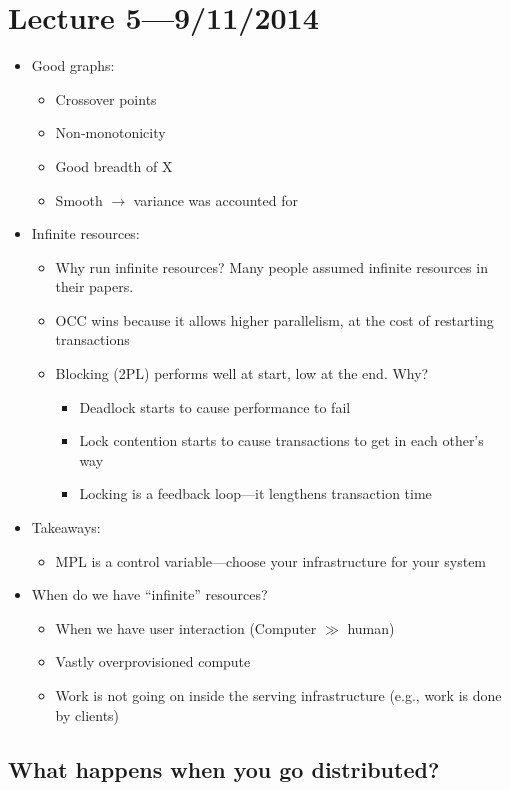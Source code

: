 \documentclass[10pt]{article}
\begin{document}
\section{Lecture 5---9/11/2014}

\begin{itemize}
\item Good graphs:
\begin{itemize}
\item Crossover points
\item Non-monotonicity
\item Good breadth of X
\item Smooth $\rightarrow$ variance was accounted for
\end{itemize}
\item Infinite resources:
\begin{itemize}
\item Why run infinite resources? Many people assumed infinite resources in their papers.
\item OCC wins because it allows higher parallelism, at the cost of restarting transactions
\item Blocking (2PL) performs well at start, low at the end. Why?
\begin{itemize}
\item Deadlock starts to cause performance to fail
\item Lock contention starts to cause transactions to get in each other's way
\item Locking is a feedback loop---it lengthens transaction time
\end{itemize}
\end{itemize}
\item Takeaways:
\begin{itemize}
\item MPL is a control variable---choose your infrastructure for your system
\end{itemize}
\item When do we have ``infinite'' resources?
\begin{itemize}
\item When we have user interaction (Computer $\gg$ human)
\item Vastly overprovisioned compute
\item Work is not going on inside the serving infrastructure (e.g., work is done by clients)
\end{itemize}
\end{itemize}

\subsection{What happens when you go distributed?}
\end{document}
